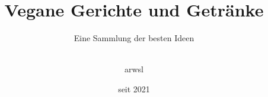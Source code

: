 
\subject{\vspace{2cm}
	\large Rezeptsammlung
	\vspace{1cm}
	}
\title{Vegane Gerichte und Getränke}
\subtitle{Eine Sammlung der besten Ideen}

\author{\vspace{4cm}\\
	arwsl\\
	\vspace{2cm}}

\date{seit 2021}




\maketitle
\thispagestyle{empty}
\cleardoublepage
